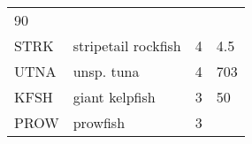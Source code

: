 \documentclass[]{article}
\begin{document}
\begin{longtable}[c]{@{}llll@{}}
\begin{minipage}[t]{0.23\columnwidth}
90
\end{minipage}
\\\addlinespace
\begin{minipage}[t]{0.08\columnwidth}\raggedright
STRK
\end{minipage} & \begin{minipage}[t]{0.36\columnwidth}\raggedright
stripetail rockfish
\end{minipage} & \begin{minipage}[t]{0.21\columnwidth}\raggedright
4
\end{minipage} & \begin{minipage}[t]{0.23\columnwidth}\raggedright
4.5
\end{minipage}
\\\addlinespace
\begin{minipage}[t]{0.08\columnwidth}\raggedright
UTNA
\end{minipage} & \begin{minipage}[t]{0.36\columnwidth}\raggedright
unsp. tuna
\end{minipage} & \begin{minipage}[t]{0.21\columnwidth}\raggedright
4
\end{minipage} & \begin{minipage}[t]{0.23\columnwidth}\raggedright
703
\end{minipage}
\\\addlinespace
\begin{minipage}[t]{0.08\columnwidth}\raggedright
KFSH
\end{minipage} & \begin{minipage}[t]{0.36\columnwidth}\raggedright
giant kelpfish
\end{minipage} & \begin{minipage}[t]{0.21\columnwidth}\raggedright
3
\end{minipage} & \begin{minipage}[t]{0.23\columnwidth}\raggedright
50
\end{minipage}
\\\addlinespace
\begin{minipage}[t]{0.08\columnwidth}\raggedright
PROW
\end{minipage} & \begin{minipage}[t]{0.36\columnwidth}\raggedright
prowfish
\end{minipage} & \begin{minipage}[t]{0.21\columnwidth}\raggedright
3
\end{minipage} & \begin{minipage}[t]{0.23\columnwidth}\raggedright

\end{minipage}
\end{longtable}
\end{document}
